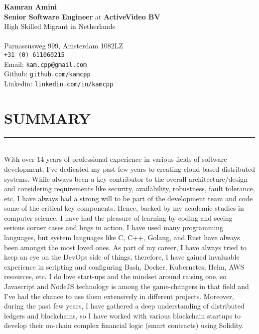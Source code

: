 \documentclass[10pt,a4paper]{article}
\begin{document}
\noindent \textbf{Kamran Amini} \\
\noindent \small \textbf{Senior Software Engineer} at \textbf{ActiveVideo BV} \\
\noindent \small High Skilled Migrant in Netherlands \\ \\
Parnassusweg 999, Amsterdam 1082LZ \\
\texttt{+31 (0) 611060215} \\
Email: \texttt{kam.cpp@gmail.com} \\
Github: \texttt{github.com/kamcpp} \\
Linkedin: \texttt{linkedin.com/in/kamcpp} 

\section{SUMMARY}
\noindent \rule {18.0cm}{0.2pt} \\
\small With over 14 years of professional experience in various fields of software development, I've dedicated my past few years to creating cloud-based distributed systems. While always been a key contributor to the overall architecture/design and considering requirements like security, availability, robustness, fault tolerance, etc, I have always had a strong will to be part of the development team and code some of the critical key components. Hence, backed by my academic studies in computer science, I have had the pleasure of learning by coding and seeing serious corner cases and bugs in action. I have used many programming languages, but system languages like C, C++, Golang, and Rust have always been amongst the most loved ones. As part of my career, I have always tried to keep an eye on the DevOps side of things, therefore, I have gained invaluable experience in scripting and configuring Bash, Docker, Kubernetes, Helm, AWS resources, etc. I do love start-ups and the mindset around raising one, so Javascript and NodeJS technology is among the game-changers in that field and I've had the chance to use them extensively in different projects. Moreover, during the past few years, I have gathered a deep understanding of distributed ledgers and blockchains, so I have worked with various blockchain startups to develop their on-chain complex financial logic (smart contracts) using Solidity.

\small
\end{document}
